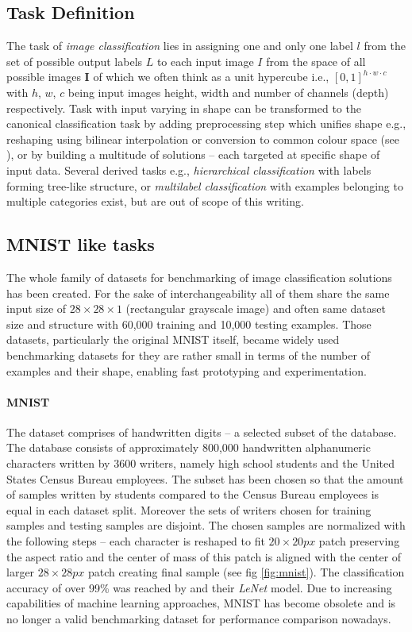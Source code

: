 \subsection{Task Definition}
The task of \emph{image classification} lies in assigning one and only one label $l$ from the set of possible output labels $L$ to each input image $I$ from the space of all possible images $\mathbf{I}$ of which we often think as a unit hypercube i.e., $[0,1]^{h \cdot w \cdot c}$ with $h$, $w$, $c$ being input images height, width and number of channels (depth) respectively. Task with input varying in shape can be transformed to the canonical classification task by adding preprocessing step which unifies shape e.g., reshaping using bilinear interpolation or conversion to common colour space (see \cite{computer_vision}), or by building a multitude of solutions -- each targeted at specific shape of input data. Several derived tasks e.g., \emph{hierarchical classification} with labels forming tree-like structure, or \emph{multilabel classification} with examples belonging to multiple categories exist, but are out of scope of this writing.

\subsection{MNIST like tasks}
\label{subsec:mnist_tasks}
The whole family of datasets for benchmarking of image classification solutions has been created. For the sake of interchangeability all of them share the same input size of $28 \times 28 \times 1$ (rectangular grayscale image) and often same dataset size and structure with 60,000 training and 10,000 testing examples. Those datasets, particularly the original MNIST itself, became widely used benchmarking datasets for they are rather small in terms of the number of examples and their shape, enabling fast prototyping and experimentation.

\paragraph{MNIST}

The dataset comprises of handwritten digits -- a selected subset of the \cite{NIST_19} database. The database consists of approximately 800,000 handwritten alphanumeric characters written by 3600 writers, namely high school students and the United States Census Bureau employees. The subset has been chosen so that the amount of samples written by students compared to the Census Bureau employees is equal in each dataset split. Moreover the sets of writers chosen for training samples and testing samples are disjoint. The chosen samples are normalized with the following steps -- each character is reshaped to fit $20 \times 20px$ patch preserving the aspect ratio and the center of mass of this patch is aligned with the center of larger $28 \times 28px$ patch creating final sample (see fig \ref{fig:mnist}). The classification accuracy of over 99\% was reached by \cite{Lecun98gradient-basedlearning} and their \emph{LeNet} model. Due to increasing capabilities of machine learning approaches, MNIST has become obsolete and is no longer a valid benchmarking dataset for performance comparison nowadays.

